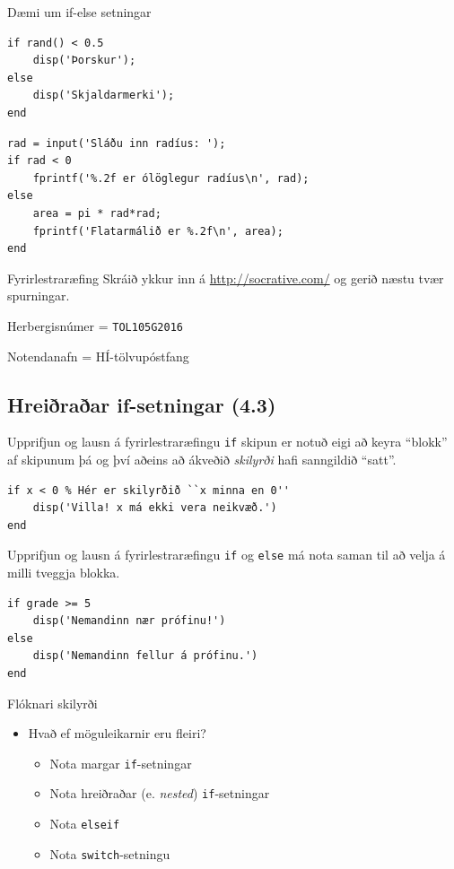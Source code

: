 \documentclass{beamer}
\begin{document}
\begin{frame}[fragile]{Dæmi um if-else setningar}
\begin{verbatim}
if rand() < 0.5
    disp('Þorskur');
else
    disp('Skjaldarmerki');
end
\end{verbatim}

\begin{verbatim}
rad = input('Sláðu inn radíus: ');
if rad < 0
    fprintf('%.2f er ólöglegur radíus\n', rad);
else
    area = pi * rad*rad;
    fprintf('Flatarmálið er %.2f\n', area);
end
\end{verbatim}
\end{frame}

\begin{frame}{Fyrirlestraræfing}
Skráið ykkur inn á \url{http://socrative.com/} og gerið næstu tvær spurningar.

Herbergisnúmer = \texttt{TOL105G2016}

Notendanafn = HÍ-tölvupóstfang
\end{frame}

\subsection{Hreiðraðar if-setningar (4.3)}

\begin{frame}[fragile]{Upprifjun og lausn á fyrirlestraræfingu}
\texttt{if} skipun er notuð eigi að keyra ``blokk'' af skipunum þá og því aðeins að ákveðið \emph{skilyrði} hafi sanngildið ``satt''.
\begin{verbatim}
if x < 0 % Hér er skilyrðið ``x minna en 0''
    disp('Villa! x má ekki vera neikvæð.')
end
\end{verbatim}
\end{frame}

\begin{frame}[fragile]{Upprifjun og lausn á fyrirlestraræfingu}
\texttt{if} og \texttt{else} má nota saman til að velja á milli tveggja blokka.
\begin{verbatim}
if grade >= 5
    disp('Nemandinn nær prófinu!')
else
    disp('Nemandinn fellur á prófinu.')
end
\end{verbatim}
\end{frame}

\begin{frame}{Flóknari skilyrði}
\begin{itemize}
 \item Hvað ef möguleikarnir eru fleiri? \pause
 \begin{itemize}
  \item Nota margar \texttt{if}-setningar
  \item Nota hreiðraðar (e. \emph{nested}) \texttt{if}-setningar
  \item Nota \texttt{elseif}
  \item Nota \texttt{switch}-setningu
 \end{itemize}
\end{itemize}
\end{frame}
\end{document}
